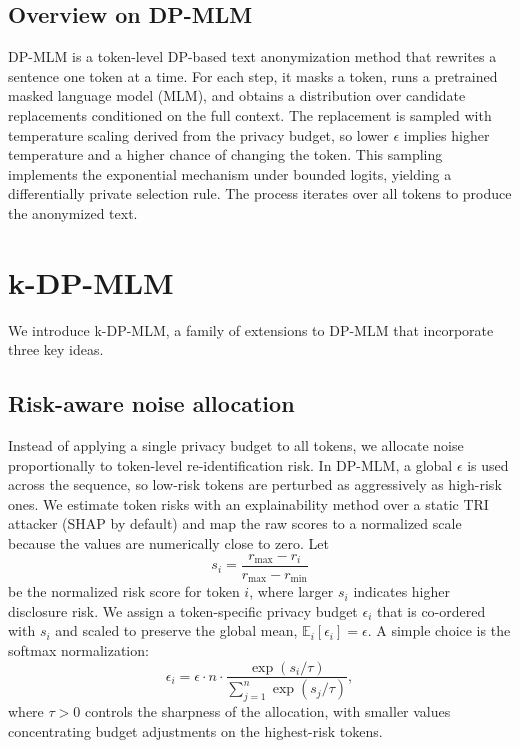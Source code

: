 \documentclass[10pt, a4paper]{article}
\begin{document}
\subsection{Overview on DP-MLM}

DP-MLM \cite{meisenbacher_dp-mlm_2024} is a token-level DP-based text anonymization method that rewrites a sentence one token at a time. For each step, it masks a token, runs a pretrained masked language model (MLM), and obtains a distribution over candidate replacements conditioned on the full context. The replacement is sampled with temperature scaling derived from the privacy budget, so lower $\epsilon$ implies higher temperature and a higher chance of changing the token. This sampling implements the exponential mechanism \cite{mcsherry_mechanism_2007} under bounded logits, yielding a differentially private selection rule. The process iterates over all tokens to produce the anonymized text.

\section{k-DP-MLM}

We introduce k-DP-MLM, a family of extensions to DP-MLM that incorporate three key ideas.

\subsection{Risk-aware noise allocation}

Instead of applying a single privacy budget to all tokens, we allocate noise proportionally to token-level re-identification risk. In DP-MLM, a global $\epsilon$ is used across the sequence, so low-risk tokens are perturbed as aggressively as high-risk ones. We estimate token risks with an explainability method over a static TRI attacker (SHAP by default) and map the raw scores to a normalized scale because the values are numerically close to zero. Let
\[
s_i = \frac{r_{\max} - r_i}{r_{\max} - r_{\min}}
\]
be the normalized risk score for token $i$, where larger $s_i$ indicates higher disclosure risk. We assign a token-specific privacy budget $\epsilon_i$ that is co-ordered with $s_i$ and scaled to preserve the global mean, $\mathbb{E}_i[\epsilon_i] = \epsilon$. A simple choice is the softmax normalization:
\begin{equation}
\epsilon_i = \epsilon \cdot n \cdot \frac{\exp (s_i / \tau) }{\sum_{j=1}^{n} \exp (s_j / \tau)},
\end{equation}
where $\tau > 0$ controls the sharpness of the allocation, with smaller values concentrating budget adjustments on the highest-risk tokens.
\end{document}
